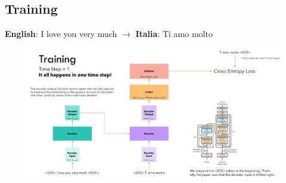 \documentclass{book}
\begin{document}
        \subsection{Training}
        \textbf{English}: I love you very much $\rightarrow$ \textbf{Italia}: Ti amo molto
        \begin{figure}[H]
            \centering
            \includegraphics[width=1.0  \linewidth]{images/12d_18.png}
    
        \end{figure}
\end{document}
